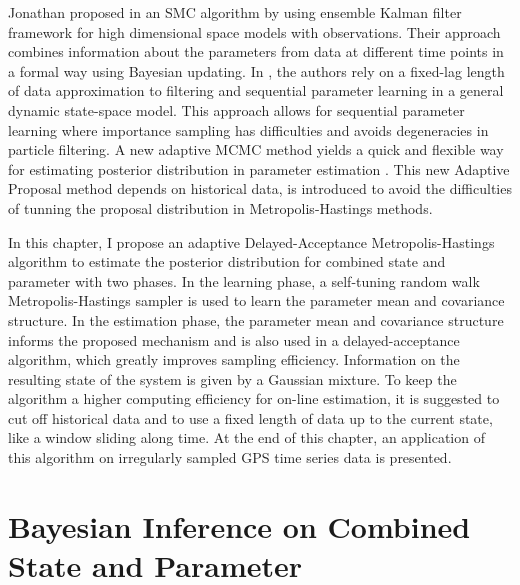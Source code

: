 Jonathan proposed in \cite{stroud2016bayesian} an SMC algorithm by using ensemble Kalman filter framework for high dimensional space models with observations. Their approach combines information about the parameters from data at different time points in a formal way using Bayesian updating. In \cite{polson2008practical}, the authors rely on a fixed-lag length of data approximation to filtering and sequential parameter learning in a general dynamic state-space model. This approach allows for sequential parameter learning where importance sampling has difficulties and avoids degeneracies in particle filtering. A new adaptive MCMC method yields a quick and flexible way for estimating posterior distribution in parameter estimation \cite{haario1999adaptive}. This new Adaptive Proposal method depends on historical data, is introduced to avoid the difficulties of tunning the proposal distribution in Metropolis-Hastings methods. 



In this chapter, I propose an adaptive Delayed-Acceptance Metropolis-Hastings algorithm to estimate the posterior distribution for combined state and parameter with two phases. In the learning phase, a self-tuning random walk Metropolis-Hastings sampler is used to learn the parameter mean and covariance structure. In the estimation phase, the parameter mean and covariance structure informs the proposed mechanism and is also used in a delayed-acceptance algorithm, which greatly improves sampling efficiency. Information on the resulting state of the system is given by a Gaussian mixture. To keep the algorithm a higher computing efficiency for on-line estimation, it is suggested to cut off historical data and to use a fixed length of data up to the current state, like a window sliding along time. At the end of this chapter, an application of this algorithm on irregularly sampled GPS time series data is presented. 

%



\section{Bayesian Inference on Combined State and Parameter}

